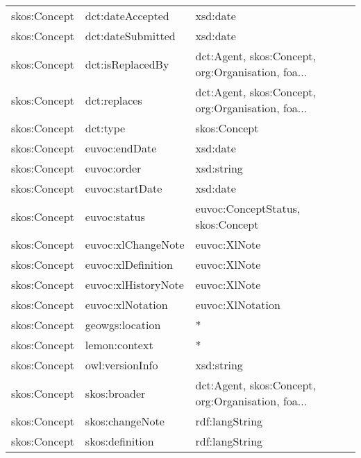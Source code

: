 \documentclass[10pt,a4paper,titlepage,final]{article}
\begin{document}
\begin{longtable}{lll}
        skos:Concept &        dct:dateAccepted &                                           xsd:date \\
        skos:Concept &       dct:dateSubmitted &                                           xsd:date \\
        skos:Concept &        dct:isReplacedBy &  dct:Agent, skos:Concept, org:Organisation, foa... \\
        skos:Concept &            dct:replaces &  dct:Agent, skos:Concept, org:Organisation, foa... \\
        skos:Concept &                dct:type &                                       skos:Concept \\
        skos:Concept &           euvoc:endDate &                                           xsd:date \\
        skos:Concept &             euvoc:order &                                         xsd:string \\
        skos:Concept &         euvoc:startDate &                                           xsd:date \\
        skos:Concept &            euvoc:status &                  euvoc:ConceptStatus, skos:Concept \\
        skos:Concept &      euvoc:xlChangeNote &                                       euvoc:XlNote \\
        skos:Concept &      euvoc:xlDefinition &                                       euvoc:XlNote \\
        skos:Concept &     euvoc:xlHistoryNote &                                       euvoc:XlNote \\
        skos:Concept &        euvoc:xlNotation &                                   euvoc:XlNotation \\
        skos:Concept &         geowgs:location &                                                  * \\
        skos:Concept &           lemon:context &                                                  * \\
        skos:Concept &         owl:versionInfo &                                         xsd:string \\
        skos:Concept &            skos:broader &  dct:Agent, skos:Concept, org:Organisation, foa... \\
        skos:Concept &         skos:changeNote &                                     rdf:langString \\
        skos:Concept &         skos:definition &                                     rdf:langString \\

\end{longtable}
\end{document}
